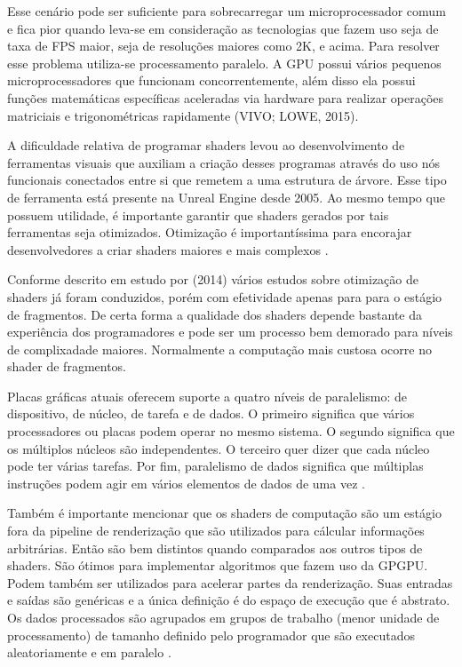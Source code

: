 Esse cenário pode ser suficiente para sobrecarregar um microprocessador comum e fica pior quando leva-se em consideração as tecnologias que fazem uso seja de taxa de FPS maior, seja de resoluções maiores como 2K, e acima. Para resolver esse problema utiliza-se processamento paralelo. A GPU possui vários pequenos microprocessadores que funcionam concorrentemente, além disso ela possui funções matemáticas específicas aceleradas via hardware para realizar operações matriciais e trigonométricas rapidamente (VIVO; LOWE, 2015)\nocite{bookOfShaders}.

A dificuldade relativa de programar shaders levou ao desenvolvimento de ferramentas visuais que auxiliam a criação desses programas através do uso nós funcionais conectados entre si que remetem a uma estrutura de árvore. Esse tipo de ferramenta está presente na Unreal Engine desde 2005. Ao mesmo tempo que possuem utilidade, é importante garantir que shaders gerados por tais ferramentas seja otimizados. Otimização é importantíssima para encorajar desenvolvedores a criar shaders maiores e mais complexos \cite{jensen2007shader}.

Conforme descrito em estudo por  (2014) vários estudos sobre otimização de shaders já foram conduzidos, porém com efetividade apenas para para o estágio de fragmentos. De certa forma a qualidade dos shaders depende bastante da experiência dos programadores e pode ser um processo bem demorado para níveis de complixadade maiores. Normalmente a computação mais custosa ocorre no shader de fragmentos. 

Placas gráficas atuais oferecem suporte a quatro níveis de paralelismo: de dispositivo, de núcleo, de tarefa e de dados. O primeiro significa que vários processadores ou placas podem operar no mesmo sistema. O segundo significa que os múltiplos núcleos são independentes. O terceiro quer dizer que cada núcleo pode ter várias tarefas. Por fim, paralelismo de dados significa que múltiplas instruções podem agir em vários elementos de dados de uma vez \cite{hasu2018modern}.

Também é importante mencionar que os shaders de computação são um estágio fora da pipeline de renderização que são utilizados para cálcular informações arbitrárias. Então são bem distintos quando comparados aos outros tipos de shaders. São ótimos para implementar algoritmos que fazem uso da GPGPU. Podem também ser utilizados para acelerar partes da renderização. Suas entradas e saídas são genéricas e a única definição é do espaço de execução que é abstrato. Os dados processados são agrupados em grupos de trabalho (menor unidade de processamento) de tamanho definido pelo programador que são executados aleatoriamente e em paralelo \cite{hasu2018modern}.  

